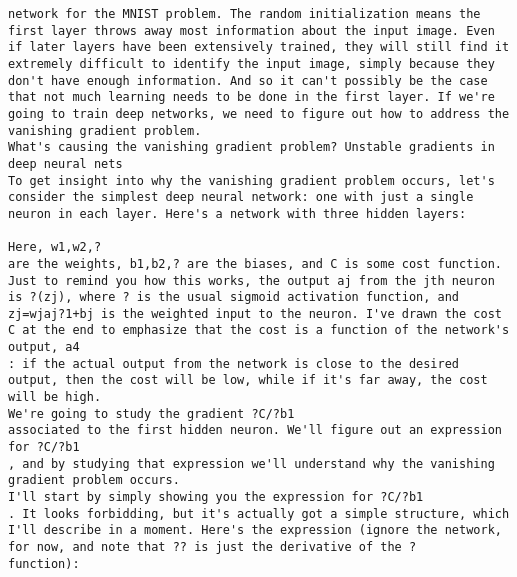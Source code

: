 \begin{lstlisting}
network for the MNIST problem. The random initialization means the first layer throws away most information about the input image. Even if later layers have been extensively trained, they will still find it extremely difficult to identify the input image, simply because they don't have enough information. And so it can't possibly be the case that not much learning needs to be done in the first layer. If we're going to train deep networks, we need to figure out how to address the vanishing gradient problem.
What's causing the vanishing gradient problem? Unstable gradients in deep neural nets
To get insight into why the vanishing gradient problem occurs, let's consider the simplest deep neural network: one with just a single neuron in each layer. Here's a network with three hidden layers: 

Here, w1,w2,?
are the weights, b1,b2,? are the biases, and C is some cost function. Just to remind you how this works, the output aj from the jth neuron is ?(zj), where ? is the usual sigmoid activation function, and zj=wjaj?1+bj is the weighted input to the neuron. I've drawn the cost C at the end to emphasize that the cost is a function of the network's output, a4
: if the actual output from the network is close to the desired output, then the cost will be low, while if it's far away, the cost will be high.
We're going to study the gradient ?C/?b1
associated to the first hidden neuron. We'll figure out an expression for ?C/?b1
, and by studying that expression we'll understand why the vanishing gradient problem occurs.
I'll start by simply showing you the expression for ?C/?b1
. It looks forbidding, but it's actually got a simple structure, which I'll describe in a moment. Here's the expression (ignore the network, for now, and note that ?? is just the derivative of the ?
function):


\end{lstlisting}
